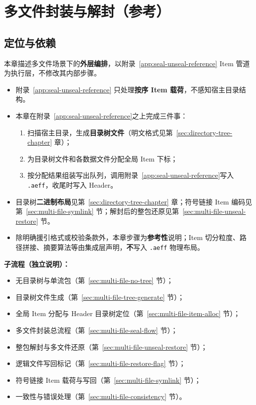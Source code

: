 
\section{多文件封装与解封（参考）}\label{sec:multi-file-chapter}

\subsection{定位与依赖}\label{sec:multi-file-scope}

本章描述多文件场景下的\textbf{外层编排}，以附录~\ref{app:seal-unseal-reference} Item 管道为执行层，不修改其内部步骤。

\begin{itemize}
  \item 附录~\ref{app:seal-unseal-reference} 只处理\textbf{按序 Item 载荷}，不感知宿主目录结构。
  \item 本章在附录~\ref{app:seal-unseal-reference}之上完成三件事：
        \begin{enumerate}
          \item 扫描宿主目录，生成\textbf{目录树文件}（明文格式见第~\ref{sec:directory-tree-chapter} 章）；
          \item 为目录树文件和各数据文件分配全局 Item 下标；
          \item 按分配结果组装写出队列，调用附录~\ref{app:seal-unseal-reference}写入 \texttt{.aeff}，收尾时写入 Header。
        \end{enumerate}
  \item 目录树\textbf{二进制布局}见第~\ref{sec:directory-tree-chapter} 章；符号链接 Item 编码见第~\ref{sec:multi-file-symlink} 节；解封后的整包还原见第~\ref{sec:multi-file-unseal-restore} 节。
  \item 除明确援引格式或校验条款外，本章步骤为\textbf{参考性}说明；Item 切分粒度、路径拼接、摘要算法等由集成层声明，\textbf{不}写入 \texttt{.aeff} 物理布局。
\end{itemize}

\textbf{子流程（独立说明）：}
\begin{itemize}
  \item 无目录树与单流包（第~\ref{sec:multi-file-no-tree} 节）；
  \item 目录树文件生成（第~\ref{sec:multi-file-tree-generate} 节）；
  \item 全局 Item 分配与 Header 目录树定位（第~\ref{sec:multi-file-item-alloc} 节）；
  \item 多文件封装总流程（第~\ref{sec:multi-file-seal-flow} 节）；
  \item 整包解封与多文件还原（第~\ref{sec:multi-file-unseal-restore} 节）；
  \item 逻辑文件写回标记（第~\ref{sec:multi-file-restore-flag} 节）；
  \item 符号链接 Item 载荷与写回（第~\ref{sec:multi-file-symlink} 节）；
  \item 一致性与错误处理（第~\ref{sec:multi-file-consistency} 节）。
\end{itemize}

